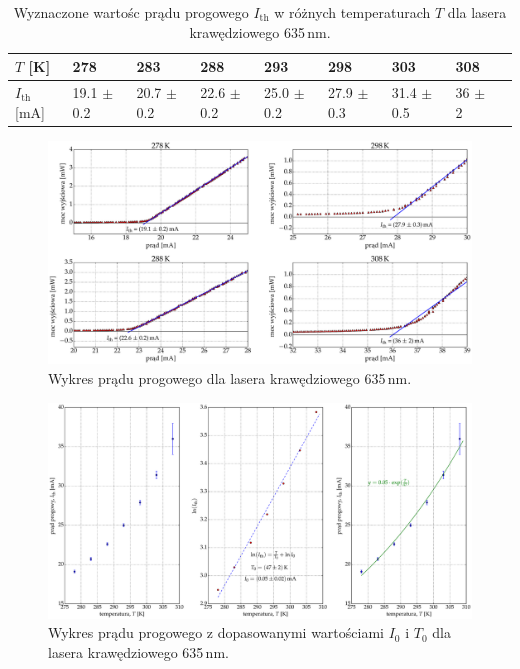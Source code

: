 \newpage
\begin{table}
\begin{center}
\caption{ Wyznaczone wartośc prądu progowego $I_{\mathrm{th}}$ w różnych temperaturach $T$ dla lasera krawędziowego 635\,nm. }
\begin{tabular}{ | C{1.5cm}|  C{1.5cm} | C{1.5cm} | C{1.5cm}| C{1.5cm} | C{1.5cm}| C{1.5cm}| C{2.0cm}| C{2.0cm}|}
\hline
$T$ [K] 	&   278 & 283  	& 288 & 293 & 298 & 303 & 308 \\ \hline
$I_{\mathrm{th}}$ [mA]  &	19.1 $\pm$ 0.2  & 20.7 $\pm$ 0.2 & 22.6 $\pm$ 0.2 &
25.0 $\pm$ 0.2  & 27.9 $\pm$ 0.3 & 31.4 $\pm$ 0.5 & 36 $\pm$ 2	\\ \hline
\end{tabular}
\label{tab:tabela_635}
\end{center}
\end{table}
\begin{figure}
\center
  \includegraphics[scale=0.30]{plot635/plot_i_th_4.eps}
  \caption{Wykres prądu progowego dla lasera krawędziowego 635\,nm.}
  \label{fig:plot_i_th_4}
\end{figure}
\begin{figure}
\center
  \includegraphics[scale=0.30]{plot635/plot_fit.eps}
  \caption{Wykres prądu progowego z dopasowanymi wartościami $I_{0}$ i $T_{0}$ dla lasera krawędziowego 635\,nm.}
  \label{fig:plot_fit}
\end{figure}
